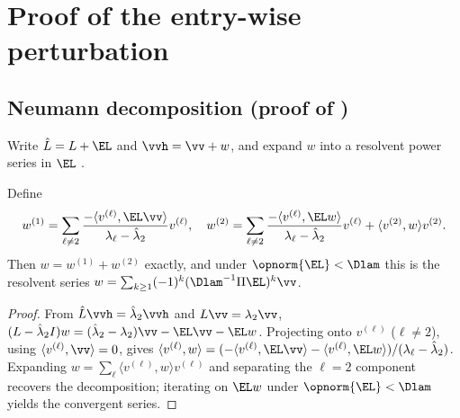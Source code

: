 %
\section{Proof of the entry-wise perturbation}\label{app:comp3}

\subsection{Neumann decomposition (proof of )}\label{app:comp3a}

Write $\hat L=L+\EL$ and $\vvh=\vv+w$, and expand $w$ into a resolvent power series
in $\EL$ \cite{eldridge2017unperturbed}.

\begin{lemma}\label{lem:C-series}
Define
\[
   w^{(1)}=\sum_{\ell\ne2}\frac{-\langle v^{(\ell)},\EL\vv\rangle}
        {\lambda_\ell-\hat\lambda_2}v^{(\ell)},
   \quad
   w^{(2)}=\sum_{\ell\ne2}\frac{-\langle v^{(\ell)},\EL w\rangle}
        {\lambda_\ell-\hat\lambda_2}v^{(\ell)}+\langle v^{(2)},w\rangle v^{(2)}.
\]
Then $w=w^{(1)}+w^{(2)}$ exactly, and under $\opnorm{\EL}<\Dlam$ this is the
resolvent series $w=\sum_{k\ge1}(-1)^k(\Dlam^{-1}\Pi\EL)^k\vv$.
\end{lemma}
\begin{proof}
From $\hat L\vvh=\hat\lambda_2\vvh$ and $L\vv=\lambda_2\vv$,
$(L-\hat\lambda_2I)w=(\hat\lambda_2-\lambda_2)\vv-\EL\vv-\EL w$. Projecting onto
$v^{(\ell)}$ ($\ell\ne2$), using $\langle v^{(\ell)},\vv\rangle=0$, gives
$\langle v^{(\ell)},w\rangle=(-\langle v^{(\ell)},\EL\vv\rangle-\langle
v^{(\ell)},\EL w\rangle)/(\lambda_\ell-\hat\lambda_2)$. Expanding
$w=\sum_\ell\langle v^{(\ell)},w\rangle v^{(\ell)}$ and separating the $\ell=2$
component recovers the decomposition; iterating on $\EL w$ under $\opnorm{\EL}<\Dlam$
yields the convergent series.
\end{proof}

